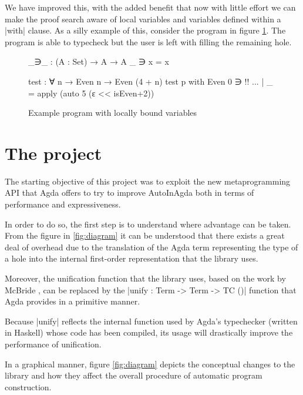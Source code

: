 \documentclass[a4paper]{article}
\begin{document}
We have improved this, with the added benefit that now with little effort we can
make the proof search aware of local variables and variables defined within a
|with| clause.
As a silly example of this, consider the program in figure \ref{fig:silly}. The
program is able to typecheck but the user is left with filling the remaining
hole.

\begin{figure}[ht]
\scriptsize
\centering
\begin{code}
  _∋_ : (A : Set) → A → A
  _ ∋ x = x

  test : ∀ {n} → Even n → Even (4 + n)
  test p with Even 0 ∋ {!!}
  ... | _ = apply (auto 5 (ε << isEven+2))
\end{code}
  \caption{Example program with locally bound variables}
  \label{fig:silly}
\end{figure}

\noindent

\section{The project}
\label{sec:project}

The starting objective of this project was to exploit the new metaprogramming API
that Agda offers to try to improve AutoInAgda both in terms of performance and
expressiveness.

In order to do so, the first step is to understand where advantage can be taken.
From the figure in \ref{fig:diagram} it can be understood that there exists a great
deal of overhead due to the translation of the Agda term representing the type
of a hole into the internal first-order representation that the library uses.

Moreover, the unification function that the library uses, based on the work by
McBride \cite{McBride2003FirstorderUB}, can be replaced by the |unify :
Term -> Term -> TC ()| function that Agda provides in a primitive manner.

Because |unify| reflects the internal function used by Agda's typechecker
(written in Haskell) whose code has been compiled, its usage will drastically
improve the performance of unification.

In a graphical manner, figure \ref{fig:diagram} depicts the conceptual changes
to the library and how they affect the overall procedure of automatic program
construction.
\end{document}
